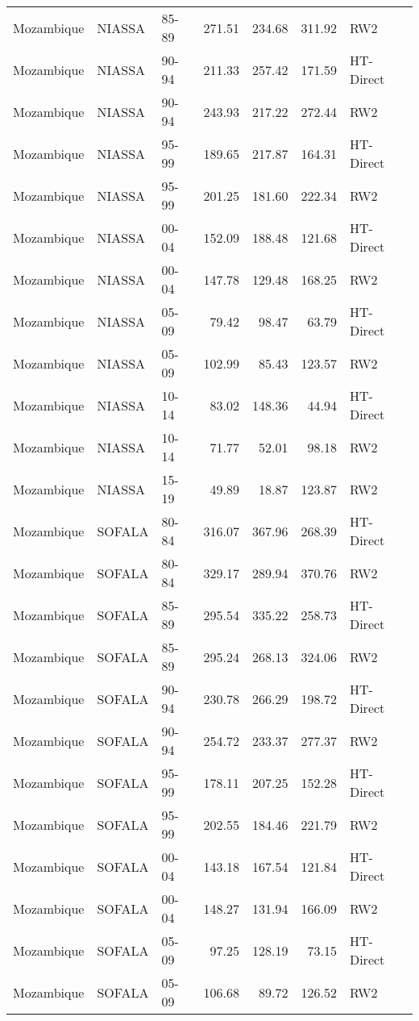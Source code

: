 \begin{longtable}{lllrrrl}
  Mozambique & NIASSA & 85-89 & 271.51 & 234.68 & 311.92 & RW2 \\ 
  Mozambique & NIASSA & 90-94 & 211.33 & 257.42 & 171.59 & HT-Direct \\ 
  Mozambique & NIASSA & 90-94 & 243.93 & 217.22 & 272.44 & RW2 \\ 
  Mozambique & NIASSA & 95-99 & 189.65 & 217.87 & 164.31 & HT-Direct \\ 
  Mozambique & NIASSA & 95-99 & 201.25 & 181.60 & 222.34 & RW2 \\ 
  Mozambique & NIASSA & 00-04 & 152.09 & 188.48 & 121.68 & HT-Direct \\ 
  Mozambique & NIASSA & 00-04 & 147.78 & 129.48 & 168.25 & RW2 \\ 
  Mozambique & NIASSA & 05-09 & 79.42 & 98.47 & 63.79 & HT-Direct \\ 
  Mozambique & NIASSA & 05-09 & 102.99 & 85.43 & 123.57 & RW2 \\ 
  Mozambique & NIASSA & 10-14 & 83.02 & 148.36 & 44.94 & HT-Direct \\ 
  Mozambique & NIASSA & 10-14 & 71.77 & 52.01 & 98.18 & RW2 \\ 
  Mozambique & NIASSA & 15-19 & 49.89 & 18.87 & 123.87 & RW2 \\ 
  Mozambique & SOFALA & 80-84 & 316.07 & 367.96 & 268.39 & HT-Direct \\ 
  Mozambique & SOFALA & 80-84 & 329.17 & 289.94 & 370.76 & RW2 \\ 
  Mozambique & SOFALA & 85-89 & 295.54 & 335.22 & 258.73 & HT-Direct \\ 
  Mozambique & SOFALA & 85-89 & 295.24 & 268.13 & 324.06 & RW2 \\ 
  Mozambique & SOFALA & 90-94 & 230.78 & 266.29 & 198.72 & HT-Direct \\ 
  Mozambique & SOFALA & 90-94 & 254.72 & 233.37 & 277.37 & RW2 \\ 
  Mozambique & SOFALA & 95-99 & 178.11 & 207.25 & 152.28 & HT-Direct \\ 
  Mozambique & SOFALA & 95-99 & 202.55 & 184.46 & 221.79 & RW2 \\ 
  Mozambique & SOFALA & 00-04 & 143.18 & 167.54 & 121.84 & HT-Direct \\ 
  Mozambique & SOFALA & 00-04 & 148.27 & 131.94 & 166.09 & RW2 \\ 
  Mozambique & SOFALA & 05-09 & 97.25 & 128.19 & 73.15 & HT-Direct \\ 
  Mozambique & SOFALA & 05-09 & 106.68 & 89.72 & 126.52 & RW2 \\ 

\end{longtable}
